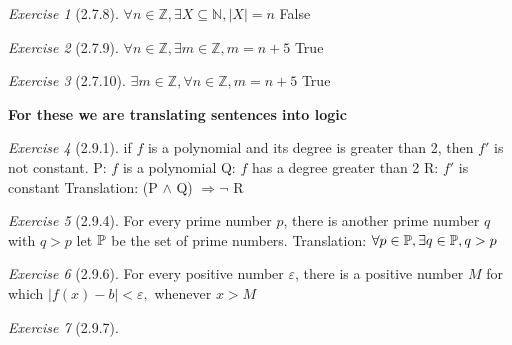 \documentclass[12pt]{amsart}
\theoremstyle{remark}
\newtheorem*{exercise}{Exercise}%
\newcommand{\NN}{\ensuremath{\mathbb N}}
\newcommand{\ZZ}{\ensuremath{\mathbb Z}}
\newcommand{\PP}{{\ensuremath\mathbb P}}
\theoremstyle{mycomment}
\begin{document}
\begin{exercise}[2.7.8] $\forall n \in \ZZ, \exists X \subseteq \NN, |X| = n$ \newline
	False
\end{exercise}
\begin{exercise}[2.7.9] $\forall n \in \ZZ, \exists m \in \ZZ, m = n +5$ \newline 
	True
\end{exercise}
\begin{exercise}[2.7.10] $\exists m \in \ZZ, \forall n \in \ZZ, m = n+5$ \newline
True
\end{exercise}
\textbf{For these we are translating sentences into logic}
\begin{exercise}[2.9.1] if $f$ is a polynomial and its degree is greater than 2, then $f'$ is not constant.
	P: $f$ is a polynomial \newline
	Q: $f$ has a degree greater than 2 \newline
	R: $f'$ is constant \newline
	Translation: (P $\land$ Q) $\Rightarrow \neg$ R
\end{exercise}
\begin{exercise}[2.9.4]  For every prime number $p$, there is another prime number $q$ with $q > p$ \newline
	let $\PP$ be the set of prime numbers. \newline
	Translation: $\forall p \in \PP, \exists q \in \PP, q > p$  
\end{exercise}
\begin{exercise}[2.9.6] For every positive number $\varepsilon$, there is a positive number $M$ for which \newline $|f(x) - b| < \varepsilon, $ whenever $x > M$
\end{exercise}
\begin{exercise}[2.9.7]
\end{exercise}
 
\end{document}
